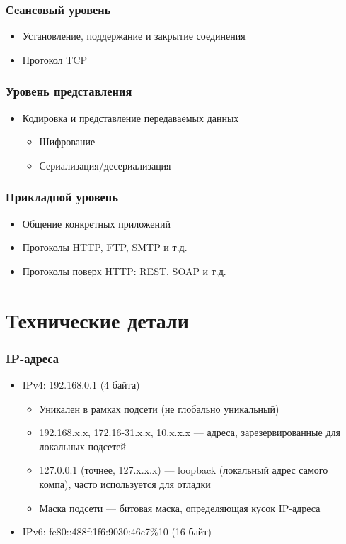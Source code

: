 \documentclass[xetex,mathserif,serif]{beamer}
\begin{document}
    \begin{frame}
        \frametitle{Сеансовый уровень}
        \begin{itemize}
            \item Установление, поддержание и закрытие соединения
            \item Протокол TCP
        \end{itemize}
    \end{frame}

    \begin{frame}
        \frametitle{Уровень представления}
        \begin{itemize}
            \item Кодировка и представление передаваемых данных
            \begin{itemize}
                \item Шифрование
                \item Сериализация/десериализация
            \end{itemize}
        \end{itemize}
    \end{frame}

    \begin{frame}
        \frametitle{Прикладной уровень}
        \begin{itemize}
            \item Общение конкретных приложений
            \item Протоколы HTTP, FTP, SMTP и т.д.
            \item Протоколы поверх HTTP: REST, SOAP и т.д.
        \end{itemize}
    \end{frame}

    \section{Технические детали}

    \begin{frame}
        \frametitle{IP-адреса}
        \begin{itemize}
            \item IPv4: 192.168.0.1 (4 байта)
            \begin{itemize}
                \item Уникален в рамках подсети (не глобально уникальный)
                \item 192.168.x.x, 172.16-31.x.x, 10.x.x.x --- адреса, зарезервированные для локальных подсетей
                \item 127.0.0.1 (точнее, 127.x.x.x) --- loopback (локальный адрес самого компа), часто используется для отладки
                \item Маска подсети --- битовая маска, определяющая кусок IP-адреса
            \end{itemize}
            \item IPv6: fe80::488f:1f6:9030:46c7\%10 (16 байт)
        \end{itemize}
    \end{frame}
\end{document}
